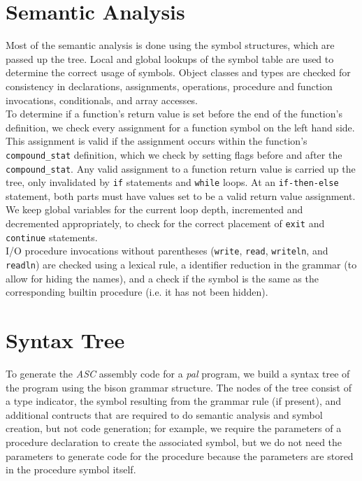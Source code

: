\documentclass{report}
\begin{document}
\section*{Semantic Analysis}
Most of the semantic analysis is done using the symbol structures, which are passed up the tree. Local and global lookups of the symbol table are used to determine the correct usage of symbols. Object classes and types are checked for consistency in declarations, assignments, operations, procedure and function invocations, conditionals, and array accesses.\\

To determine if a function's return value is set before the end of the function's definition, we check every assignment for a function symbol on the left hand side. This assignment is valid if the assignment occurs within the function's \texttt{compound\_stat} definition, which we check by setting flags before and after the \texttt{compound\_stat}. Any valid assignment to a function return value is carried up the tree, only invalidated by \texttt{if} statements and \texttt{while} loops. At an \texttt{if-then-else} statement, both parts must have values set to be a valid return value assignment.\\
We keep global variables for the current loop depth, incremented and decremented appropriately, to check for the correct placement of \texttt{exit} and \texttt{continue} statements.\\

I/O procedure invocations without parentheses (\texttt{write}, \texttt{read}, \texttt{writeln}, and \texttt{readln}) are checked using a lexical rule, a identifier reduction in the grammar (to allow for hiding the names), and a check if the symbol is the same as the corresponding builtin procedure (i.e. it has not been hidden).


\section*{Syntax Tree}
To generate the \emph{ASC} assembly code for a \emph{pal} program, we build a syntax tree of the program using the bison grammar structure. The nodes of the tree consist of a type indicator, the symbol resulting from the grammar rule (if present), and additional contructs that are required to do semantic analysis and symbol creation, but not code generation; for example, we require the parameters of a procedure declaration to create the associated symbol, but we do not need the parameters to generate code for the procedure because the parameters are stored in the procedure symbol itself.\\
\end{document}
